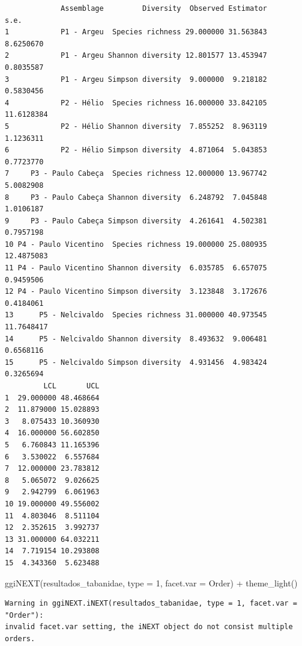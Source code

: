 \documentclass[
  letterpaper,
  DIV=11,
  numbers=noendperiod]{scrartcl}
\newenvironment{Shaded}{\begin{snugshade}}{\end{snugshade}}
\newcommand{\AttributeTok}[1]{\textcolor[rgb]{0.40,0.45,0.13}{#1}}
\newcommand{\DecValTok}[1]{\textcolor[rgb]{0.68,0.00,0.00}{#1}}
\newcommand{\FunctionTok}[1]{\textcolor[rgb]{0.28,0.35,0.67}{#1}}
\newcommand{\NormalTok}[1]{\textcolor[rgb]{0.00,0.23,0.31}{#1}}
\newcommand{\SpecialCharTok}[1]{\textcolor[rgb]{0.37,0.37,0.37}{#1}}
\newcommand{\StringTok}[1]{\textcolor[rgb]{0.13,0.47,0.30}{#1}}
\begin{document}
\begin{verbatim}
             Assemblage         Diversity  Observed Estimator       s.e.
1            P1 - Argeu  Species richness 29.000000 31.563843  8.6250670
2            P1 - Argeu Shannon diversity 12.801577 13.453947  0.8035587
3            P1 - Argeu Simpson diversity  9.000000  9.218182  0.5830456
4            P2 - Hélio  Species richness 16.000000 33.842105 11.6128384
5            P2 - Hélio Shannon diversity  7.855252  8.963119  1.1236311
6            P2 - Hélio Simpson diversity  4.871064  5.043853  0.7723770
7     P3 - Paulo Cabeça  Species richness 12.000000 13.967742  5.0082908
8     P3 - Paulo Cabeça Shannon diversity  6.248792  7.045848  1.0106187
9     P3 - Paulo Cabeça Simpson diversity  4.261641  4.502381  0.7957198
10 P4 - Paulo Vicentino  Species richness 19.000000 25.080935 12.4875083
11 P4 - Paulo Vicentino Shannon diversity  6.035785  6.657075  0.9459506
12 P4 - Paulo Vicentino Simpson diversity  3.123848  3.172676  0.4184061
13      P5 - Nelcivaldo  Species richness 31.000000 40.973545 11.7648417
14      P5 - Nelcivaldo Shannon diversity  8.493632  9.006481  0.6568116
15      P5 - Nelcivaldo Simpson diversity  4.931456  4.983424  0.3265694
         LCL       UCL
1  29.000000 48.468664
2  11.879000 15.028893
3   8.075433 10.360930
4  16.000000 56.602850
5   6.760843 11.165396
6   3.530022  6.557684
7  12.000000 23.783812
8   5.065072  9.026625
9   2.942799  6.061963
10 19.000000 49.556002
11  4.803046  8.511104
12  2.352615  3.992737
13 31.000000 64.032211
14  7.719154 10.293808
15  4.343360  5.623488
\end{verbatim}

\begin{Shaded}
\begin{Highlighting}[]
\FunctionTok{ggiNEXT}\NormalTok{(resultados\_tabanidae, }\AttributeTok{type =} \DecValTok{1}\NormalTok{, }\AttributeTok{facet.var =} \StringTok{\textquotesingle{}Order\textquotesingle{}}\NormalTok{) }\SpecialCharTok{+} 
  \FunctionTok{theme\_light}\NormalTok{() }
\end{Highlighting}
\end{Shaded}

\begin{verbatim}
Warning in ggiNEXT.iNEXT(resultados_tabanidae, type = 1, facet.var = "Order"):
invalid facet.var setting, the iNEXT object do not consist multiple orders.
\end{verbatim}
\end{document}
